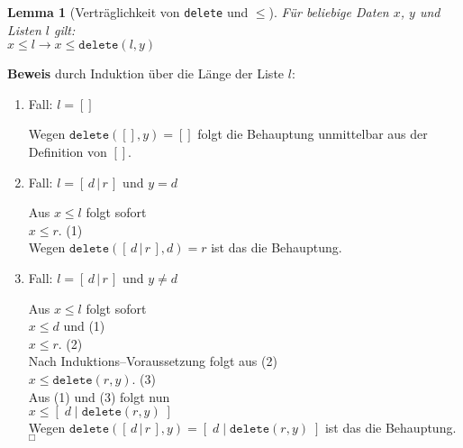 \documentclass{article}
\newtheorem{Lemma}[Definition]{Lemma}
\begin{document}
\begin{Lemma}[Vertr\"aglichkeit von \texttt{delete} und $\leq$] 
\label{l4}
F\"ur beliebige Daten $x$, $y$   und Listen $l$ gilt: \\[0.1cm]
\hspace*{1.3cm} $x \leq l \rightarrow x \leq \mathtt{delete}(l,y)$
\end{Lemma}
\textbf{Beweis} durch Induktion \"uber die L\"ange der Liste $l$:
\begin{enumerate}
\item Fall: $l = []$

      Wegen $\mathtt{delete}([],y) = []$ folgt die Behauptung unmittelbar aus der
      Definition von $[]$.
\item Fall: $l = [\,d\,|\,r\,]$ und $y = d$

      Aus $x \leq l$ folgt sofort \\[0.1cm]
      \hspace*{1.3cm} $x \leq r$. \hspace*{\fill} (1) \\[0.1cm]
      Wegen $\mathtt{delete}([\,d\,|\,r\,],d) = r$ ist das die Behauptung.
\item Fall:  $l = [\,d\,|\,r\,]$ und $y \not= d$

      Aus $x \leq l$ folgt sofort \\[0.1cm]
      \hspace*{1.3cm} $x \leq d$ \quad und \hspace*{\fill} (1) \\[0.1cm]
      \hspace*{1.3cm} $x \leq r$. \hspace*{\fill} (2) \\[0.1cm]
      Nach Induktions--Voraussetzung folgt aus (2) \\[0.1cm]
      \hspace*{1.3cm} $x \leq \mathtt{delete}(r,y)$. \hspace*{\fill} (3) \\[0.1cm]
      Aus (1) und (3) folgt nun \\[0.1cm]
      \hspace*{1.3cm} $x \leq [\;d\;|\;\mathtt{delete}(r,y)\;]$ \\[0.1cm]
      Wegen $\mathtt{delete}([\,d\,|\,r\,],y) = [\;d\;|\;\mathtt{delete}(r,y)\;]$ ist das die Behauptung.
      \hspace*{\fill} $_\Box$
\end{enumerate}
\end{document}
